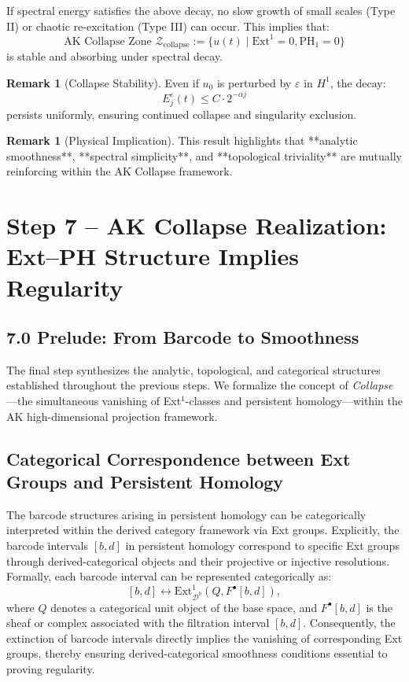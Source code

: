 \documentclass[11pt]{article}
\theoremstyle{definition}
\newtheorem{remark}[theorem]{Remark}
\begin{document}
If spectral energy satisfies the above decay, no slow growth of small scales (Type II) or chaotic re-excitation (Type III) can occur. This implies that:
\[
\text{AK Collapse Zone } \mathcal{Z}_{\text{collapse}} := \{ u(t) \mid \mathrm{Ext}^1 = 0, \mathrm{PH}_1 = 0 \}
\]
is stable and absorbing under spectral decay.

\begin{remark}[Collapse Stability]
Even if $u_0$ is perturbed by $\varepsilon$ in $H^1$, the decay:
\[
E_j^\varepsilon(t) \le C \cdot 2^{-\alpha j}
\]
persists uniformly, ensuring continued collapse and singularity exclusion.
\end{remark}

\begin{remark}[Physical Implication]
This result highlights that **analytic smoothness**, **spectral simplicity**, and **topological triviality** are mutually reinforcing within the AK Collapse framework.
\end{remark}



\section{Step 7 – AK Collapse Realization: Ext–PH Structure Implies Regularity}

\subsection*{7.0 Prelude: From Barcode to Smoothness}

The final step synthesizes the analytic, topological, and categorical structures established throughout the previous steps.  
We formalize the concept of \emph{Collapse}—the simultaneous vanishing of Ext$^1$-classes and persistent homology—within the AK high-dimensional projection framework.

\subsection{Categorical Correspondence between Ext Groups and Persistent Homology}

The barcode structures arising in persistent homology can be categorically interpreted within the derived category framework via Ext groups. Explicitly, the barcode intervals $[b,d]$ in persistent homology correspond to specific Ext groups through derived-categorical objects and their projective or injective resolutions. Formally, each barcode interval can be represented categorically as:
\[
[b,d] \longleftrightarrow \mathrm{Ext}^1_{\mathcal{D}^b}(Q,F^\bullet[b,d]),
\]
where $Q$ denotes a categorical unit object of the base space, and $F^\bullet[b,d]$ is the sheaf or complex associated with the filtration interval $[b,d]$. Consequently, the extinction of barcode intervals directly implies the vanishing of corresponding Ext groups, thereby ensuring derived-categorical smoothness conditions essential to proving regularity.
\end{document}
